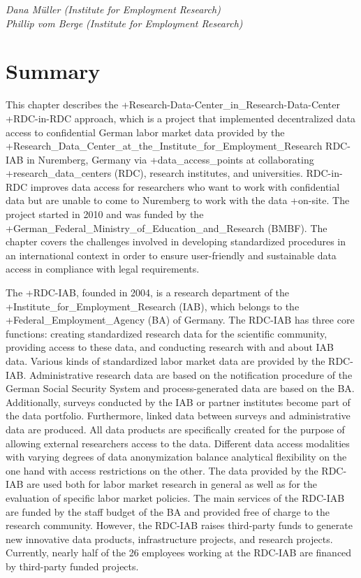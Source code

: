 \documentclass[
]{book}
\begin{document}
\emph{Dana Müller (Institute for Employment Research)}\\
\emph{Phillip vom Berge (Institute for Employment Research)}

\hypertarget{summary-1}{%
\section{Summary}\label{summary-1}}

This chapter describes the +Research-Data-Center\_in\_Research-Data-Center\textbar{} +RDC-in-RDC\textbar{} approach, which is a project that implemented decentralized data access to confidential German labor market data provided by the +Research\_Data\_Center\_at\_the\_Institute\_for\_Employment\_Research\textbar{} RDC-IAB in Nuremberg, Germany via +data\_access\_points\textbar{} at collaborating +research\_data\_centers\textbar{} (RDC), research institutes, and universities. RDC-in-RDC improves data access for researchers who want to work with confidential data but are unable to come to Nuremberg to work with the data +on-site\textbar. The project started in 2010 and was funded by the +German\_Federal\_Ministry\_of\_Education\_and\_Research\textbar{} (BMBF). The chapter covers the challenges involved in developing standardized procedures in an international context in order to ensure user-friendly and sustainable data access in compliance with legal requirements.

The +RDC-IAB\textbar, founded in 2004, is a research department of the +Institute\_for\_Employment\_Research\textbar{} (IAB), which belongs to the +Federal\_Employment\_Agency\textbar{} (BA) of Germany. The RDC-IAB has three core functions: creating standardized research data for the scientific community, providing access to these data, and conducting research with and about IAB data. Various kinds of standardized labor market data are provided by the RDC-IAB. Administrative research data are based on the notification procedure of the German Social Security System and process-generated data are based on the BA. Additionally, surveys conducted by the IAB or partner institutes become part of the data portfolio. Furthermore, linked data between surveys and administrative data are produced. All data products are specifically created for the purpose of allowing external researchers access to the data. Different data access modalities with varying degrees of data anonymization balance analytical flexibility on the one hand with access restrictions on the other. The data provided by the RDC-IAB are used both for labor market research in general as well as for the evaluation of specific labor market policies. The main services of the RDC-IAB are funded by the staff budget of the BA and provided free of charge to the research community. However, the RDC-IAB raises third-party funds to generate new innovative data products, infrastructure projects, and research projects. Currently, nearly half of the 26 employees working at the RDC-IAB are financed by third-party funded projects.
\end{document}
